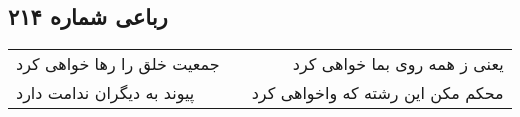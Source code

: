 \begin{center}
\section*{رباعی شماره ۲۱۴}
\label{sec:sh214}
\begin{longtable}{l p{0.5cm} r}
جمعیت خلق را رها خواهی کرد
&&
یعنی ز همه روی بما خواهی کرد
\\
پیوند به دیگران ندامت دارد
&&
محکم مکن این رشته که واخواهی کرد
\\
\end{longtable}
\end{center}
